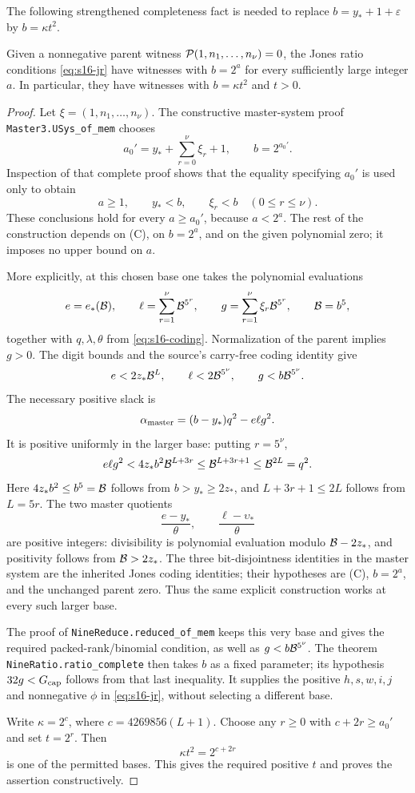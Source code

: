 The following strengthened completeness fact is needed to replace
\(b=y_*+1+\varepsilon\) by \(b=\kappa t^2\).

\begin{lemma}\label{lem:s16-cofinal}
Given a nonnegative parent witness
\({\cal P}(1,n_1,\ldots,n_\nu)=0\), the Jones ratio conditions
\eqref{eq:s16-jr} have witnesses with \(b=2^a\) for every sufficiently
large integer \(a\).  In particular, they have witnesses with
\(b=\kappa t^2\) and \(t>0\).
\end{lemma}
\begin{proof}
Let \(\xi=(1,n_1,\ldots,n_\nu)\).
The constructive master-system proof
\texttt{Master3.USys\_of\_mem} chooses
\[
 a_0'=y_*+\sum_{r=0}^{\nu}\xi_r+1,\qquad b=2^{a_0'}.
\]
Inspection of that complete proof shows that the equality specifying
\(a_0'\) is used only to obtain
\[
 a\geq1,\qquad y_*<b,\qquad \xi_r<b\quad(0\leq r\leq\nu).
 \tag{C}
\]
These conclusions hold for every \(a\geq a_0'\), because
\(a<2^a\).  The rest of the construction depends on (C), on \(b=2^a\),
and on the given polynomial zero; it imposes no upper bound on \(a\).

More explicitly, at this chosen base one takes the polynomial evaluations
\[
 e=e_*({\cal B}),\qquad
 \ell=\sum_{r=1}^{\nu}{\cal B}^{5^r},\qquad
 g=\sum_{r=1}^{\nu}\xi_r{\cal B}^{5^r},\qquad {\cal B}=b^5,
\]
together with \(q,\lambda,\theta\) from \eqref{eq:s16-coding}.
Normalization of the parent implies \(g>0\).
The digit bounds and the source's carry-free coding identity give
\[
 e<2z_*{\cal B}^{L},\qquad
 \ell<2{\cal B}^{5^\nu},\qquad
 g<b{\cal B}^{5^\nu}.
\]
The necessary positive slack is
\[
 \alpha_{\rm master}
       =(b-y_*)q^2-e\ell g^2.
\]
It is positive uniformly in the larger base: putting \(r=5^\nu\),
\[
 e\ell g^2
 <4z_*b^2{\cal B}^{L+3r}
 \leq{\cal B}^{L+3r+1}
 \leq{\cal B}^{2L}=q^2.
\]
Here \(4z_*b^2\leq b^5={\cal B}\) follows from \(b>y_*\geq2z_*\),
and \(L+3r+1\leq2L\) follows from \(L=5r\).
The two master quotients
\[
 \frac{e-y_*}{\theta},\qquad
 \frac{\ell-\upsilon_*}{\theta}
\]
are positive integers: divisibility is polynomial evaluation modulo
\({\cal B}-2z_*\), and positivity follows from
\({\cal B}>2z_*\).  The three bit-disjointness identities in the master
system are the inherited Jones coding identities; their hypotheses are
(C), \(b=2^a\), and the unchanged parent zero.  Thus the same explicit
construction works at every such larger base.

The proof of \texttt{NineReduce.reduced\_of\_mem} keeps this very base
and gives the required packed-rank/binomial condition, as well as
\(g<b{\cal B}^{5^\nu}\).  The theorem
\texttt{NineRatio.ratio\_complete} then takes \(b\) as a fixed parameter;
its hypothesis \(32g<G_{\rm cap}\) follows from that last inequality.
It supplies the positive \(h,s,w,i,j\) and nonnegative \(\phi\) in
\eqref{eq:s16-jr}, without selecting a different base.

Write \(\kappa=2^c\), where
\(c=4269856(L+1)\).  Choose any \(r\geq0\) with
\(c+2r\geq a_0'\) and set \(t=2^r\).  Then
\[
 \kappa t^2=2^{c+2r}
\]
is one of the permitted bases.  This gives the required positive \(t\)
and proves the assertion constructively.
\end{proof}

